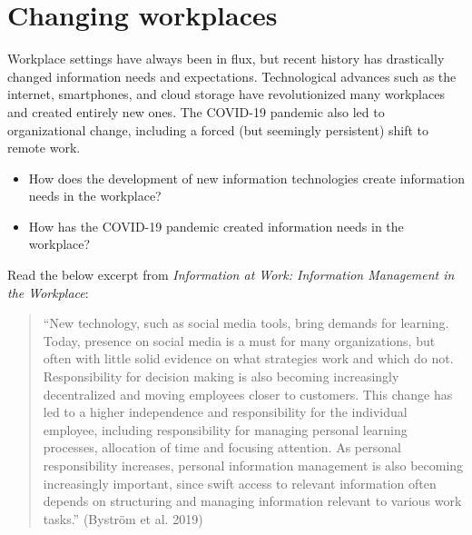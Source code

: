 \documentclass[
  letterpaper,
  DIV=11,
  numbers=noendperiod]{scrreprt}
\begin{document}
\section{\texorpdfstring{\textbf{Changing
workplaces}}{Changing workplaces}}\label{changing-workplaces}

Workplace settings have always been in flux, but recent history has
drastically changed information needs and expectations. Technological
advances such as the internet, smartphones, and cloud storage have
revolutionized many workplaces and created entirely new ones. The
COVID-19 pandemic also led to organizational change, including a forced
(but seemingly persistent) shift to remote work.

\begin{tcolorbox}[enhanced jigsaw, arc=.35mm, bottomrule=.15mm, bottomtitle=1mm, breakable, colback=white, colbacktitle=quarto-callout-tip-color!10!white, colframe=quarto-callout-tip-color-frame, coltitle=black, left=2mm, leftrule=.75mm, opacityback=0, opacitybacktitle=0.6, rightrule=.15mm, title=\textcolor{quarto-callout-tip-color}{\faLightbulb}\hspace{0.5em}{Pause and reflect}, titlerule=0mm, toprule=.15mm, toptitle=1mm]

\begin{itemize}
\item
  How does the development of new information technologies create
  information needs in the workplace?
\item
  How has the COVID-19 pandemic created information needs in the
  workplace?
\end{itemize}

\end{tcolorbox}

Read the below excerpt from \emph{Information at Work: Information
Management in the Workplace}:

\begin{quote}
``New technology, such as social media tools, bring demands for
learning. Today, presence on social media is a must for many
organizations, but often with little solid evidence on what strategies
work and which do not. Responsibility for decision making is also
becoming increasingly decentralized and moving employees closer to
customers. This change has led to a higher independence and
responsibility for the individual employee, including responsibility for
managing personal learning processes, allocation of time and focusing
attention. As personal responsibility increases, personal information
management is also becoming increasingly important, since swift access
to relevant information often depends on structuring and managing
information relevant to various work tasks.'' (Byström et al. 2019)
\end{quote}
\end{document}
